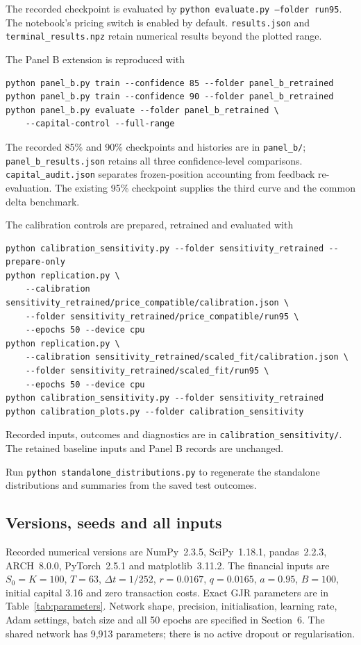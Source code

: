 \documentclass[11pt,a4paper]{article}
\newcommand{\dt}{\Delta t}
\theoremstyle{remark}
\begin{document}
The recorded checkpoint is evaluated by \texttt{python evaluate.py --folder run95}. The notebook's pricing switch is enabled by default. \texttt{results.json} and \texttt{terminal\_results.npz} retain numerical results beyond the plotted range.

The Panel B extension is reproduced with
\begin{verbatim}
python panel_b.py train --confidence 85 --folder panel_b_retrained
python panel_b.py train --confidence 90 --folder panel_b_retrained
python panel_b.py evaluate --folder panel_b_retrained \
    --capital-control --full-range
\end{verbatim}
The recorded 85\% and 90\% checkpoints and histories are in \texttt{panel\_b/}; \texttt{panel\_b\_results.json} retains all three confidence-level comparisons. \texttt{capital\_audit.json} separates frozen-position accounting from feedback re-evaluation. The existing 95\% checkpoint supplies the third curve and the common delta benchmark.

The calibration controls are prepared, retrained and evaluated with
\begin{verbatim}
python calibration_sensitivity.py --folder sensitivity_retrained --prepare-only
python replication.py \
    --calibration sensitivity_retrained/price_compatible/calibration.json \
    --folder sensitivity_retrained/price_compatible/run95 \
    --epochs 50 --device cpu
python replication.py \
    --calibration sensitivity_retrained/scaled_fit/calibration.json \
    --folder sensitivity_retrained/scaled_fit/run95 \
    --epochs 50 --device cpu
python calibration_sensitivity.py --folder sensitivity_retrained
python calibration_plots.py --folder calibration_sensitivity
\end{verbatim}
Recorded inputs, outcomes and diagnostics are in \texttt{calibration\_sensitivity/}. The retained baseline inputs and Panel B records are unchanged.

Run \texttt{python standalone\_distributions.py} to regenerate the standalone distributions and summaries from the saved test outcomes.

\subsection{Versions, seeds and all inputs}
Recorded numerical versions are NumPy~2.3.5, SciPy~1.18.1, pandas~2.2.3, ARCH~8.0.0, PyTorch~2.5.1 and matplotlib~3.11.2. The financial inputs are $S_0=K=100$, $T=63$, $\dt=1/252$, $r=0.0167$, $q=0.0165$, $a=0.95$, $B=100$, initial capital 3.16 and zero transaction costs. Exact GJR parameters are in Table~\ref{tab:parameters}. Network shape, precision, initialisation, learning rate, Adam settings, batch size and all 50 epochs are specified in Section~6. The shared network has 9,913 parameters; there is no active dropout or regularisation.
\end{document}
